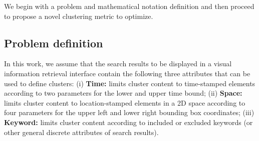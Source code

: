 We begin with a problem and mathematical notation definition and then proceed to propose a novel clustering metric to optimize.



\subsection{Problem definition}

In this work, we assume that the search results to be displayed in a visual information retrieval interface contain the following three attributes that can be used to define clusters:
(i) {\bf Time:} limits cluster content to time-stamped elements according to two parameters for the lower and upper time bound; 
(ii) {\bf Space:} limits cluster content to location-stamped elements in a 2D space according to four parameters for the upper left and lower right bounding box coordinates; 
(iii) {\bf Keyword:} limits cluster content according to included or excluded keywords (or other general discrete attributes of search results).


